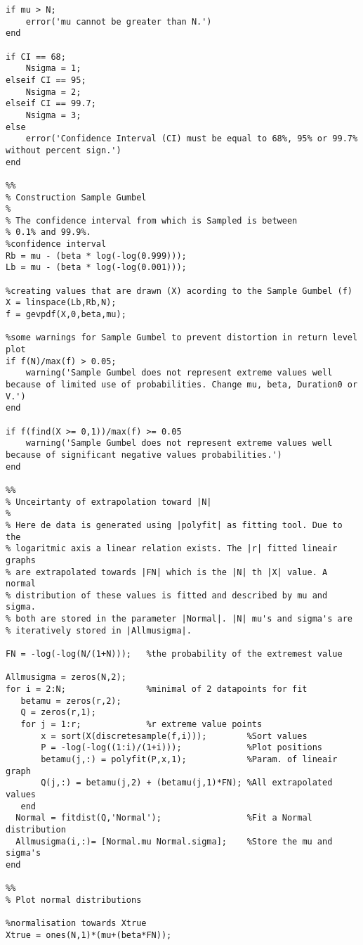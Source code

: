 \begin{lstlisting}
if mu > N;
    error('mu cannot be greater than N.')
end

if CI == 68;
    Nsigma = 1;
elseif CI == 95;
    Nsigma = 2;
elseif CI == 99.7;
    Nsigma = 3;
else 
    error('Confidence Interval (CI) must be equal to 68%, 95% or 99.7% without percent sign.')
end

%%
% Construction Sample Gumbel
%
% The confidence interval from which is Sampled is between
% 0.1% and 99.9%.
%confidence interval
Rb = mu - (beta * log(-log(0.999)));
Lb = mu - (beta * log(-log(0.001)));

%creating values that are drawn (X) acording to the Sample Gumbel (f)
X = linspace(Lb,Rb,N); 
f = gevpdf(X,0,beta,mu);

%some warnings for Sample Gumbel to prevent distortion in return level plot
if f(N)/max(f) > 0.05;
    warning('Sample Gumbel does not represent extreme values well because of limited use of probabilities. Change mu, beta, Duration0 or V.')
end

if f(find(X >= 0,1))/max(f) >= 0.05
    warning('Sample Gumbel does not represent extreme values well because of significant negative values probabilities.')
end

%% 
% Unceirtanty of extrapolation toward |N| 
%
% Here de data is generated using |polyfit| as fitting tool. Due to the
% logaritmic axis a linear relation exists. The |r| fitted lineair graphs
% are extrapolated towards |FN| which is the |N| th |X| value. A normal 
% distribution of these values is fitted and described by mu and sigma.
% both are stored in the parameter |Normal|. |N| mu's and sigma's are
% iteratively stored in |Allmusigma|.

FN = -log(-log(N/(1+N)));   %the probability of the extremest value

Allmusigma = zeros(N,2);
for i = 2:N;                %minimal of 2 datapoints for fit
   betamu = zeros(r,2);
   Q = zeros(r,1);
   for j = 1:r;             %r extreme value points 
       x = sort(X(discretesample(f,i)));        %Sort values 
       P = -log(-log((1:i)/(1+i)));             %Plot positions
       betamu(j,:) = polyfit(P,x,1);            %Param. of lineair graph
       Q(j,:) = betamu(j,2) + (betamu(j,1)*FN); %All extrapolated values
   end
  Normal = fitdist(Q,'Normal');                 %Fit a Normal distribution 
  Allmusigma(i,:)= [Normal.mu Normal.sigma];    %Store the mu and sigma's 
end

%% 
% Plot normal distributions

%normalisation towards Xtrue
Xtrue = ones(N,1)*(mu+(beta*FN));


\end{lstlisting}
